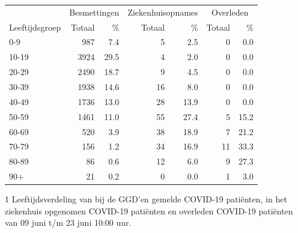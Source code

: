 \documentclass[
  english,
  man,floatsintext]{apa6}
\begin{document}
\begin{table}
\centering\begingroup\fontsize{11}{13}\selectfont

\begin{threeparttable}
\begin{tabular}{lrrrrrr}
\toprule
\multicolumn{1}{c}{ } & \multicolumn{2}{c}{Besmettingen} & \multicolumn{2}{c}{Ziekenhuisopnames} & \multicolumn{2}{c}{Overleden} \\
\cmidrule(l{3pt}r{3pt}){2-3} \cmidrule(l{3pt}r{3pt}){4-5} \cmidrule(l{3pt}r{3pt}){6-7}
Leeftijdsgroep & Totaal & \% & Totaal & \% & Totaal & \%\\
\midrule
0-9 & 987 & 7.4 & 5 & 2.5 & 0 & 0.0\\
10-19 & 3924 & 29.5 & 4 & 2.0 & 0 & 0.0\\
20-29 & 2490 & 18.7 & 9 & 4.5 & 0 & 0.0\\
30-39 & 1938 & 14.6 & 16 & 8.0 & 0 & 0.0\\
40-49 & 1736 & 13.0 & 28 & 13.9 & 0 & 0.0\\
50-59 & 1461 & 11.0 & 55 & 27.4 & 5 & 15.2\\
60-69 & 520 & 3.9 & 38 & 18.9 & 7 & 21.2\\
70-79 & 156 & 1.2 & 34 & 16.9 & 11 & 33.3\\
80-89 & 86 & 0.6 & 12 & 6.0 & 9 & 27.3\\
90+ & 21 & 0.2 & 0 & 0.0 & 1 & 3.0\\
\bottomrule
\end{tabular}
\begin{tablenotes}
\item[1] Leeftijdsverdeling van bij de GGD’en gemelde COVID-19 patiënten, in het ziekenhuis opgenomen COVID-19 patiënten en overleden COVID-19 patiënten van 09 juni t/m 23 juni 10:00 uur.
\end{tablenotes}
\end{threeparttable}
\endgroup{}
\end{table}

\newpage
\end{document}
